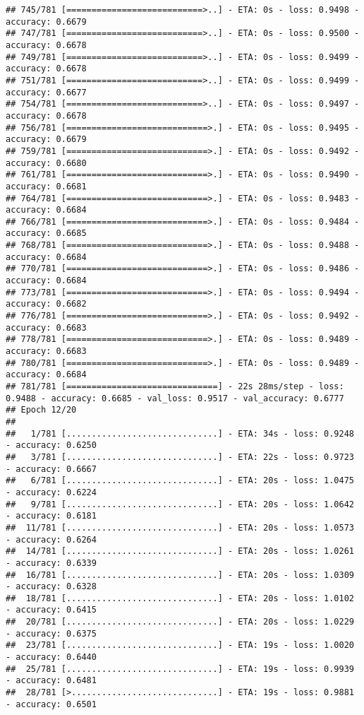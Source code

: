 \documentclass[
]{article}
\begin{document}
\begin{verbatim}
## 745/781 [===========================>..] - ETA: 0s - loss: 0.9498 - accuracy: 0.6679
## 747/781 [===========================>..] - ETA: 0s - loss: 0.9500 - accuracy: 0.6678
## 749/781 [===========================>..] - ETA: 0s - loss: 0.9499 - accuracy: 0.6678
## 751/781 [===========================>..] - ETA: 0s - loss: 0.9499 - accuracy: 0.6677
## 754/781 [===========================>..] - ETA: 0s - loss: 0.9497 - accuracy: 0.6678
## 756/781 [============================>.] - ETA: 0s - loss: 0.9495 - accuracy: 0.6679
## 759/781 [============================>.] - ETA: 0s - loss: 0.9492 - accuracy: 0.6680
## 761/781 [============================>.] - ETA: 0s - loss: 0.9490 - accuracy: 0.6681
## 764/781 [============================>.] - ETA: 0s - loss: 0.9483 - accuracy: 0.6684
## 766/781 [============================>.] - ETA: 0s - loss: 0.9484 - accuracy: 0.6685
## 768/781 [============================>.] - ETA: 0s - loss: 0.9488 - accuracy: 0.6684
## 770/781 [============================>.] - ETA: 0s - loss: 0.9486 - accuracy: 0.6684
## 773/781 [============================>.] - ETA: 0s - loss: 0.9494 - accuracy: 0.6682
## 776/781 [============================>.] - ETA: 0s - loss: 0.9492 - accuracy: 0.6683
## 778/781 [============================>.] - ETA: 0s - loss: 0.9489 - accuracy: 0.6683
## 780/781 [============================>.] - ETA: 0s - loss: 0.9489 - accuracy: 0.6684
## 781/781 [==============================] - 22s 28ms/step - loss: 0.9488 - accuracy: 0.6685 - val_loss: 0.9517 - val_accuracy: 0.6777
## Epoch 12/20
## 
##   1/781 [..............................] - ETA: 34s - loss: 0.9248 - accuracy: 0.6250
##   3/781 [..............................] - ETA: 22s - loss: 0.9723 - accuracy: 0.6667
##   6/781 [..............................] - ETA: 20s - loss: 1.0475 - accuracy: 0.6224
##   9/781 [..............................] - ETA: 20s - loss: 1.0642 - accuracy: 0.6181
##  11/781 [..............................] - ETA: 20s - loss: 1.0573 - accuracy: 0.6264
##  14/781 [..............................] - ETA: 20s - loss: 1.0261 - accuracy: 0.6339
##  16/781 [..............................] - ETA: 20s - loss: 1.0309 - accuracy: 0.6328
##  18/781 [..............................] - ETA: 20s - loss: 1.0102 - accuracy: 0.6415
##  20/781 [..............................] - ETA: 20s - loss: 1.0229 - accuracy: 0.6375
##  23/781 [..............................] - ETA: 19s - loss: 1.0020 - accuracy: 0.6440
##  25/781 [..............................] - ETA: 19s - loss: 0.9939 - accuracy: 0.6481
##  28/781 [>.............................] - ETA: 19s - loss: 0.9881 - accuracy: 0.6501

\end{verbatim}
\end{document}
